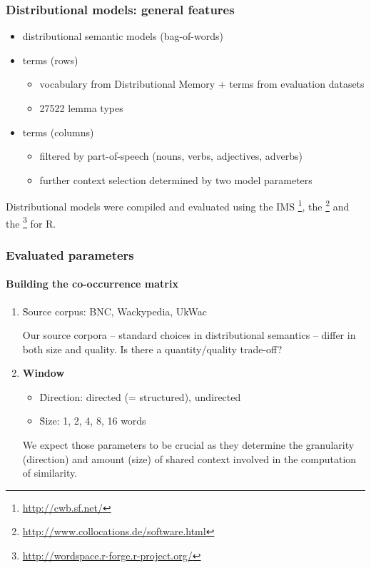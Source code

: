 \documentclass[t]{beamer} %
\begin{document}
\begin{frame}
  \frametitle{Distributional models: general features}
  \begin{itemize}
  \item {} distributional semantic models (bag-of-words)
  \item {} terms (rows)
    \begin{itemize}
    \item vocabulary from Distributional Memory \citep{Baroni:Lenci:10} + terms from evaluation datasets
    \item 27522 lemma types 
    \end{itemize} 
  \item {} terms (columns)
    \begin{itemize}
    \item filtered by part-of-speech (nouns, verbs, adjectives, adverbs)
    \item further context selection determined by two model parameters
    \end{itemize}
  \end{itemize}

  \begin{block}{}\footnotesize
    Distributional models were compiled and evaluated using the IMS \footnote{\scriptsize\url{http://cwb.sf.net/}}, the \footnote{\scriptsize\url{http://www.collocations.de/software.html}} and the \footnote{\scriptsize\url{http://wordspace.r-forge.r-project.org/}} for R.
  \end{block}

\end{frame}

\begin{frame}
  \frametitle{Evaluated parameters}
  \framesubtitle{Building the co-occurrence matrix}
  \begin{enumerate}
  \item   \h{Source corpus}: BNC, Wackypedia, UkWac
    \begin{block}{}\small
      Our source corpora -- standard choices in distributional semantics -- differ in both size and quality. Is there a quantity/quality trade-off?
    \end{block}
    
  \item  \textbf{Window}
    \begin{itemize}
    \item  \h{Direction}: directed (= structured), undirected
    \item  \h{Size}: 1, 2, 4, 8, 16 words
    \end{itemize}   
    
    \begin{block}{}\small
      We expect those parameters to be crucial as they determine the granularity (direction) and amount (size) of shared context involved in the computation of similarity.  
    \end{block}          
  \end{enumerate}   
\end{frame}
\end{document}
